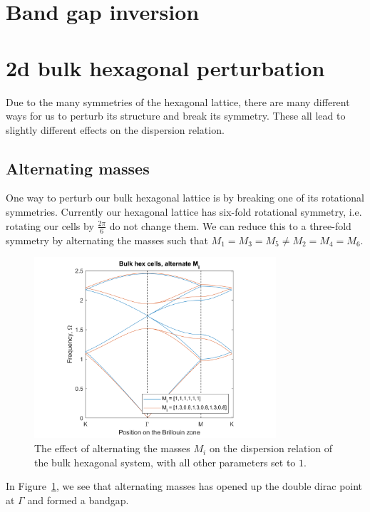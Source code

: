 \section{Band gap inversion}

\section{2d bulk hexagonal perturbation}
Due to the many symmetries of the hexagonal lattice, there are many different
ways for us to perturb its structure and break its symmetry. These all lead to
slightly different effects on the dispersion relation.

\subsection{Alternating masses}
One way to perturb our bulk hexagonal lattice is by breaking one of its
rotational symmetries. Currently our hexagonal lattice has six-fold rotational
symmetry, i.e. rotating our cells by $\frac{2\pi}{6}$ do not change them. We can
reduce this to a three-fold symmetry by alternating the masses such that
$M_1=M_3=M_5 \neq M_2=M_4=M_6$.

\begin{figure}[!h]
\centering
\includegraphics[width=0.8\textwidth]{imgs/hexperturbM.png}
\caption{\label{fig:hexM} The effect of alternating the masses $M_i$ on the
  dispersion relation of the bulk hexagonal system, with all other parameters
  set to $1$.}
\end{figure}

In Figure~\ref{fig:hexM}, we see that alternating masses has opened up the
double dirac point at $\Gamma$ and formed a bandgap.

